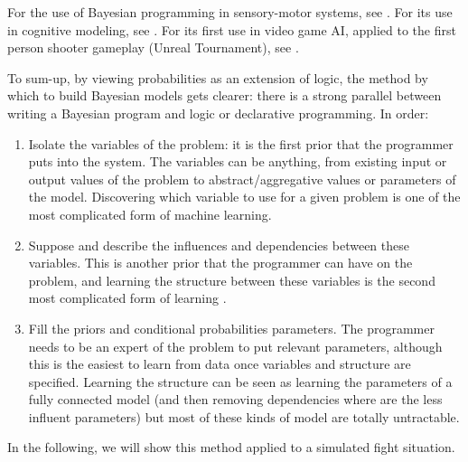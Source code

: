 For the use of Bayesian programming in sensory-motor systems, see \citep{PRDMSMS}. For its use in cognitive modeling, see \citep{Colas10}. For its first use in video game AI, applied to the first person shooter gameplay (Unreal Tournament), see \citep{LeHy04}.


To sum-up, by viewing probabilities as an extension of logic, the method by which to build Bayesian models gets clearer: there is a strong parallel between writing a Bayesian program and logic or declarative programming. In order:
\begin{enumerate}
    \item Isolate the variables of the problem: it is the first prior that the programmer puts into the system. The variables can be anything, from existing input or output values of the problem to abstract/aggregative values or parameters of the model. Discovering which variable to use for a given problem is one of the most complicated form of machine learning.
    \item Suppose and describe the influences and dependencies between these variables. This is another prior that the programmer can have on the problem, and learning the structure between these variables is the second most complicated form of learning \citep{Fra04b,Ler05a}.
    \item Fill the priors and conditional probabilities parameters. The programmer needs to be an expert of the problem to put relevant parameters, although this is the easiest to learn from data once variables and structure are specified. Learning the structure can be seen as learning the parameters of a fully connected model (and then removing dependencies where are the less influent parameters) but most of these kinds of model are totally untractable.
\end{enumerate}
In the following, we will show this method applied to a simulated  fight situation.



